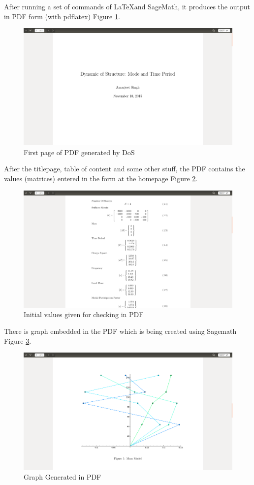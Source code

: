 After running a set of commands of \LaTeX and SageMath, it produces the
output in PDF form (with pdflatex) Figure \ref{fig:5}.
\begin{figure}[H] 
\centering \includegraphics[scale=0.31]{images/output/6.png}
\caption{First page of PDF generated by DoS}
\label{fig:5}
\end{figure}

After the titlepage, table of content and some other stuff, the PDF contains 
the values (matrices) entered in the form at the homepage Figure \ref{fig:6}.
\begin{figure}[H] 
\centering \includegraphics[scale=0.31]{images/output/7.png}
\caption{Initial values given for checking in PDF}
\label{fig:6}
\end{figure}

There is graph embedded in the PDF which is being created using Sagemath Figure \ref{fig:7}.
\begin{figure}[H] 
\centering \includegraphics[scale=0.31]{images/output/8.png}
\caption{Graph Generated in PDF}
\label{fig:7}
\end{figure}

